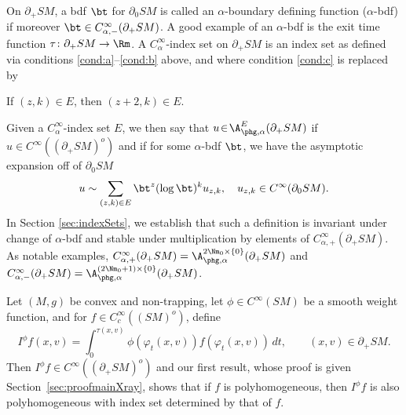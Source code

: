 On $\partial_+ SM$, a bdf $\bt$ for $\partial_0 SM$ is called an $\alpha$-boundary defining function ($\alpha$-bdf) if moreover $\bt\in C_{\alpha,-}^\infty(\partial_+ SM)$. A good example of an $\alpha$-bdf is the exit time function $\tau\colon \partial_+ SM\to \Rm$. A $C_\alpha^\infty$-index set on $\partial_+ SM$ is an index set as defined via conditions \eqref{cond:a}--\eqref{cond:b} above, and where condition \eqref{cond:c} is replaced by
\begin{enumeratea}\setcounter{enumi}{2}
\item\label{cond:c'}
If $(z,k)\in E$, then $(z+2,k)\in E$.
\end{enumeratea}
Given a $C_\alpha^\infty$-index set $E$, we then say that $u\!\in \!\A_{\phg,\alpha}^E(\partial_+ SM)$ if $u\!\in\! C^\infty((\partial_+ SM)^o)$ and if for some $\alpha$-bdf $\bt$, we have the asymptotic expansion off of $\partial_0 SM$
\begin{equation*}
u\sim \sum_{(z,k)\in E} \bt^z (\log \bt)^k u_{z,k},\quad u_{z,k}\in C^\infty(\partial_0 SM).
\end{equation*}
In Section \ref{sec:indexSets}, we establish that such a definition is invariant under change of $\alpha$-bdf and stable under multiplication by elements of $C_{\alpha,+}^\infty(\partial_+ SM)$. As notable examples, $C_{\alpha,+}^\infty(\partial_+ SM) = \A_{\phg,\alpha}^{2\Nm_0\times \{0\}} (\partial_+ SM)$ and $C_{\alpha,-}^\infty(\partial_+ SM) = \A_{\phg,\alpha}^{(2\Nm_0+1)\times \{0\}} (\partial_+ SM)$.

 \label{ssec:main}


Let $(M,g)$ be convex and non-trapping, let $\phi\in C^\infty(SM)$ be a smooth weight function, and for $f\in C_{c}^\infty((SM)^{o})$, define
\begin{equation*}
I^\phi f (x,v) = \int_0^{\tau(x,v)} \phi(\varphi_t(x,v)) f(\varphi_t (x,v))\,dt, \qquad (x,v) \in \partial_+ SM.
\end{equation*}
Then $I^\phi f\in C^\infty((\partial_+ SM)^{o})$ and our first result, whose proof is given Section~\ref{sec:proofmainXray}, shows that if $f$ is polyhomogeneous, then $I^\phi f$ is also polyhomogeneous with index set determined by that of $f$.


